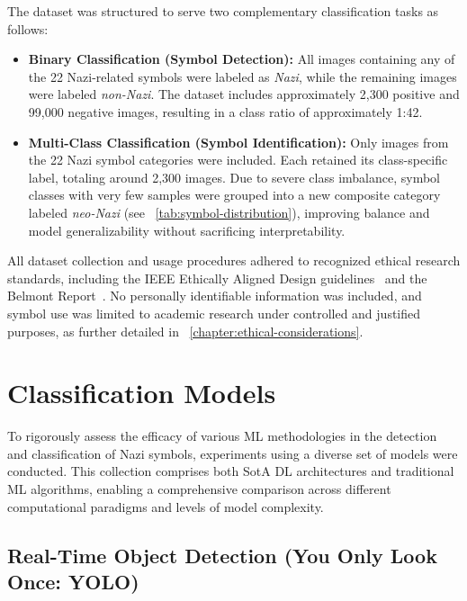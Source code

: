 The dataset was structured to serve two complementary classification tasks as follows:

\begin{itemize}
  \item \textbf{Binary Classification (Symbol Detection):} All images containing any of the 22 Nazi-related symbols
  were labeled as \textit{Nazi}, while the remaining images were labeled \textit{non-Nazi}. The dataset includes
  approximately 2,300 positive and 99,000 negative images, resulting in a class ratio of approximately 1:42.

  \item \textbf{Multi-Class Classification (Symbol Identification):} Only images from the 22 Nazi symbol categories
  were included. Each retained its class-specific label, totaling around 2,300 images. Due to severe class
  imbalance, symbol classes with very few samples were grouped into a new composite category labeled
  \textit{neo-Nazi} (see ~\autoref{tab:symbol-distribution}), improving balance and model generalizability
  without sacrificing interpretability.
\end{itemize}






\noindent All dataset collection and usage procedures adhered to recognized ethical research standards, including
the IEEE Ethically Aligned Design guidelines~\parencite{ieee2021ethics} and the Belmont
Report~\parencite{belmont1979}. No personally identifiable information was included, and symbol use was limited to
academic research under controlled and justified purposes, as further detailed in
~\autoref{chapter:ethical-considerations}.


\section{Classification Models}
To rigorously assess the efficacy of various \ac{ML} methodologies in the detection and classification of Nazi
symbols, experiments using a diverse set of models were conducted. This collection comprises both \ac{SotA}
\ac{DL} architectures and traditional \ac{ML} algorithms, enabling a comprehensive comparison across different
computational paradigms and levels of model complexity.

\subsection{Real-Time Object Detection (You Only Look Once: YOLO)}

